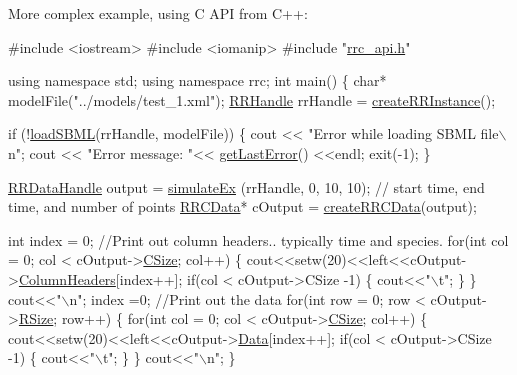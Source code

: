 More complex example, using C A\-P\-I from C++\-: 
\begin{DoxyCode}
\textcolor{preprocessor}{#include <iostream>}
\textcolor{preprocessor}{#include <iomanip>}
\textcolor{preprocessor}{#include "\hyperlink{rrc__api_8h}{rrc\_api.h}"}

\textcolor{keyword}{using namespace }std;
\textcolor{keyword}{using namespace }rrc;
\textcolor{keywordtype}{int} main()
\{
    \textcolor{keywordtype}{char}* modelFile(\textcolor{stringliteral}{"../models/test\_1.xml"});
    \hyperlink{rrc__types_8h_a1d68f0592372208fa5a5f2799ea4b3ae}{RRHandle} rrHandle = \hyperlink{group__initialization_gac5b4dbf9108edb1ea6e315379e5576e0}{createRRInstance}();

    \textcolor{keywordflow}{if} (!\hyperlink{group__loadsave_gafb3515fd8472da389f5f24530017f037}{loadSBML}(rrHandle, modelFile))
    \{
       cout << \textcolor{stringliteral}{"Error while loading SBML file\(\backslash\)n"};
       cout << \textcolor{stringliteral}{"Error message: "}<< \hyperlink{group__errorfunctions_ga79375e9d9f82fa4f07ed0e9486133f0f}{getLastError}() <<endl;
       exit(-1);
    \}

    \hyperlink{rrc__types_8h_ad0beb6fbdd576789fab9cead01d8b9e9}{RRDataHandle} output = \hyperlink{group__simulation_gac3646c86d4a058ec4d43b1a66bf127cc}{simulateEx} (rrHandle, 0, 10, 10);  \textcolor{comment}{// start time, end time,
       and number of points}
    \hyperlink{struct_r_r_c_data}{RRCData}* cOutput = \hyperlink{group__helper_routines_gacd923bcda7652f46b813619b0843bcfd}{createRRCData}(output);

    \textcolor{keywordtype}{int} index = 0;
    \textcolor{comment}{//Print out column headers.. typically time and species.}
    \textcolor{keywordflow}{for}(\textcolor{keywordtype}{int} col = 0; col < cOutput->\hyperlink{struct_r_r_c_data_a17c9a5894aa9cb3789346dcaa9c370bb}{CSize}; col++)
    \{
        cout<<setw(20)<<left<<cOutput->\hyperlink{struct_r_r_c_data_ab339159e5604808f92fe793f4f43da03}{ColumnHeaders}[index++];
        \textcolor{keywordflow}{if}(col < cOutput->CSize -1)
        \{
            cout<<\textcolor{stringliteral}{"\(\backslash\)t"};
        \}
    \}
    cout<<\textcolor{stringliteral}{"\(\backslash\)n"};
    index =0;
    \textcolor{comment}{//Print out the data}
    \textcolor{keywordflow}{for}(\textcolor{keywordtype}{int} row = 0; row < cOutput->\hyperlink{struct_r_r_c_data_a4d8512c879223c0e0d1522dae38e7819}{RSize}; row++)
    \{
        \textcolor{keywordflow}{for}(\textcolor{keywordtype}{int} col = 0; col < cOutput->\hyperlink{struct_r_r_c_data_a17c9a5894aa9cb3789346dcaa9c370bb}{CSize}; col++)
        \{
            cout<<setw(20)<<left<<cOutput->\hyperlink{struct_r_r_c_data_a7c5cbda3aa940f4b0d6e8a1679307dfc}{Data}[index++];
            \textcolor{keywordflow}{if}(col < cOutput->CSize -1)
            \{
                cout<<\textcolor{stringliteral}{"\(\backslash\)t"};
            \}
        \}
        cout<<\textcolor{stringliteral}{"\(\backslash\)n"};
      \}


\end{DoxyCode}

